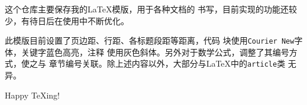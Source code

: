 这个仓库主要保存我的\LaTeX 模版，用于各种文档的
书写，目前实现的功能还较少，有待日后在使用中不断优化。

此模版目前设置了页边距、行距、各标题段距等距离，代码
块使用\verb!Courier New!字体，关键字蓝色高亮，注释
使用灰色斜体。另外对于数学公式，调整了其编号方式，使之与
章节编号关联。除上述内容以外，大部分与\LaTeX 中的\verb!article!类
无异。

Happy \TeX ing!